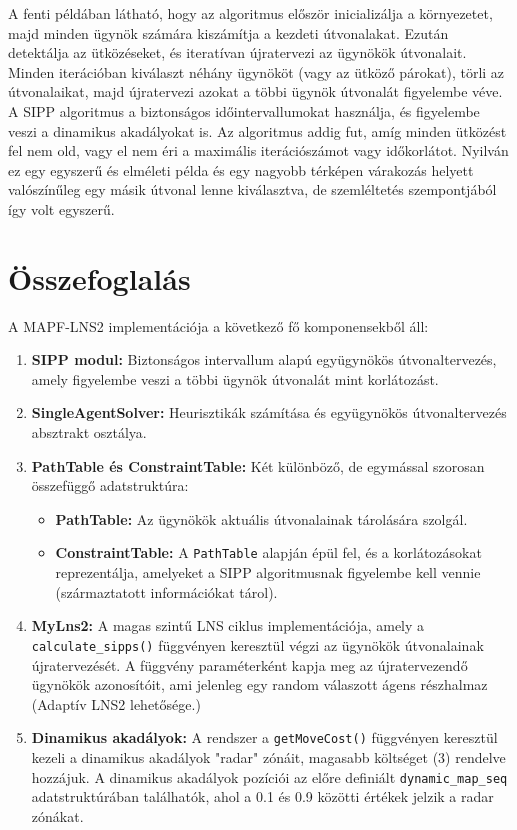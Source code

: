 \documentclass[a4paper,12pt]{article}
\begin{document}
A fenti példában látható, hogy az algoritmus először inicializálja a környezetet, majd minden ügynök számára kiszámítja a kezdeti útvonalakat. Ezután detektálja az ütközéseket, és iteratívan újratervezi az ügynökök útvonalait. Minden iterációban kiválaszt néhány ügynököt (vagy az ütköző párokat), törli az útvonalaikat, majd újratervezi azokat a többi ügynök útvonalát figyelembe véve. A SIPP algoritmus a biztonságos időintervallumokat használja, és figyelembe veszi a dinamikus akadályokat is. Az algoritmus addig fut, amíg minden ütközést fel nem old, vagy el nem éri a maximális iterációszámot vagy időkorlátot. Nyilván ez egy egyszerű és elméleti példa és egy nagyobb térképen várakozás helyett valószínűleg egy másik útvonal lenne kiválasztva, de szemléltetés szempontjából így volt egyszerű. 

\section{Összefoglalás}
A MAPF-LNS2 implementációja a következő fő komponensekből áll:
\begin{enumerate}[label=\arabic*.]
    \item \textbf{SIPP modul:} Biztonságos intervallum alapú együgynökös útvonaltervezés, amely figyelembe veszi a többi ügynök útvonalát mint korlátozást.
    \item \textbf{SingleAgentSolver:} Heurisztikák számítása és együgynökös útvonaltervezés absztrakt osztálya.
    \item \textbf{PathTable és ConstraintTable:} Két különböző, de egymással szorosan összefüggő adatstruktúra:
        \begin{itemize}
            \item \textbf{PathTable:} Az ügynökök aktuális útvonalainak tárolására szolgál.
            \item \textbf{ConstraintTable:} A \texttt{PathTable} alapján épül fel, és a korlátozásokat reprezentálja, amelyeket a SIPP algoritmusnak figyelembe kell vennie (származtatott információkat tárol).
        \end{itemize}
    \item \textbf{MyLns2:} A magas szintű LNS ciklus implementációja, amely a \texttt{calculate\_sipps()} függvényen keresztül végzi az ügynökök útvonalainak újratervezését. A függvény paraméterként kapja meg az újratervezendő ügynökök azonosítóit, ami jelenleg egy random válaszott ágens részhalmaz (Adaptív LNS2 lehetősége.)
    \item \textbf{Dinamikus akadályok:} A rendszer a \texttt{getMoveCost()} függvényen keresztül kezeli a dinamikus akadályok "radar" zónáit, magasabb költséget (3) rendelve hozzájuk. A dinamikus akadályok pozíciói az előre definiált \texttt{dynamic\_map\_seq} adatstruktúrában találhatók, ahol a 0.1 és 0.9 közötti értékek jelzik a radar zónákat.
\end{enumerate}
\end{document}
